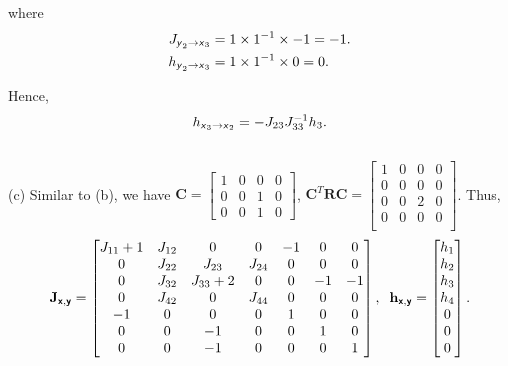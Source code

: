 \documentclass{article}
\newcommand{\s}[1]{\textsf{\textit{#1}}}
\newcommand{\bs}[1]{\textsf{\textbf{#1}}}
\newcommand{\bm}{\mathbf}
\begin{document}
where
\begin{align*}
	J_{\s{y}_2\to\s{x}_3} &= 1\times1^{-1}\times -1 = -1.\\
	h_{\s{y}_2\to\s{x}_3} &= 1\times1^{-1}\times 0 = 0.\\
\end{align*}

Hence,
\begin{align*}
	h_{\s{x}_3\to\s{x}_2} &= -J_{23}J_{33}^{-1}h_{3}.\\
\end{align*}
\\

\noindent
(c) Similar to (b), we have $\bm{C} =
\begin{bmatrix}
    1 & 0 & 0 & 0 \\
    0 & 0 & 1 & 0 \\
    0 & 0 & 1 & 0
\end{bmatrix}$, $\bm{C}^T\bm{R}\bm{C} = 
\begin{bmatrix}
    1 & 0 & 0 & 0 \\
    0 & 0 & 0 & 0 \\
    0 & 0 & 2 & 0 \\
    0 & 0 & 0 & 0 \\
\end{bmatrix}$. Thus,
\begin{align*}
\bm{J}_{\bs{x}, \bs{y}} =
\begin{bmatrix}
    J_{11} + 1 & J_{12} & 0 & 0 & -1 & 0 & 0\\
    0 & J_{22} & J_{23} & J_{24} & 0 & 0 & 0\\
    0 & J_{32} & J_{33} + 2 & 0 & 0 & -1 & -1\\
    0 & J_{42} & 0 & J_{44} & 0 & 0 & 0\\
    -1 & 0 & 0 & 0 & 1 & 0 & 0\\
    0 & 0 & -1 & 0 & 0 & 1 & 0\\
    0 & 0 & -1 & 0 & 0 & 0 & 1\\
\end{bmatrix}, \;\;
\bm{h}_{\bs{x}, \bs{y}} = 
\begin{bmatrix}
    h_1 \\
    h_2 \\
    h_3 \\
    h_4 \\
    0 \\
    0\\
    0\\
\end{bmatrix}.
\end{align*}
\end{document}
